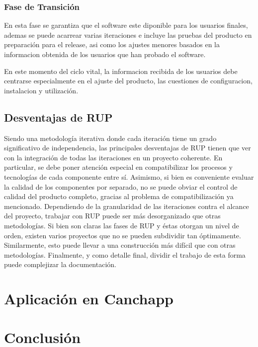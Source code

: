\documentclass[spanish]{udpreport}
\begin{document}
\subsection{Fase de Transición}
En esta fase se garantiza que el software este diponible para los usuarios finales, ademas se puede acarrear varias iteraciones e incluye las pruebas del producto en preparación para el release, asi como los ajustes menores basados en la informacion obtenida de los usuarios que han probado el software.\par
En este momento del ciclo vital, la informacion recibida de los usuarios debe centrarse especialmente en el ajuste del producto, las cuestiones de configuracion, instalacion y utilización.

\section{Desventajas de RUP}
Siendo una metodología iterativa donde cada iteración tiene un grado significativo de independencia, las principales desventajas de RUP tienen que ver con la integración de todas las iteraciones en un proyecto coherente. En particular, se debe poner atención especial en compatibilizar los procesos y tecnologías de cada componente entre sí. Asimismo, si bien es conveniente evaluar la calidad de los componentes por separado, no se puede obviar el control de calidad del producto completo, gracias al problema de compatibilización ya mencionado.
Dependiendo de la granularidad de las iteraciones contra el alcance del proyecto, trabajar con RUP puede ser más desorganizado que otras metodologías. Si bien son claras las fases de RUP y éstas otorgan un nivel de orden, existen varios proyectos que no se pueden subdividir tan óptimamente. Similarmente, esto puede llevar a una construcción más difícil que con otras metodologías.
Finalmente, y como detalle final, dividir el trabajo de esta forma puede complejizar la documentación.

\chapter{Aplicación en Canchapp}

\chapter{Conclusión}


\end{document}
